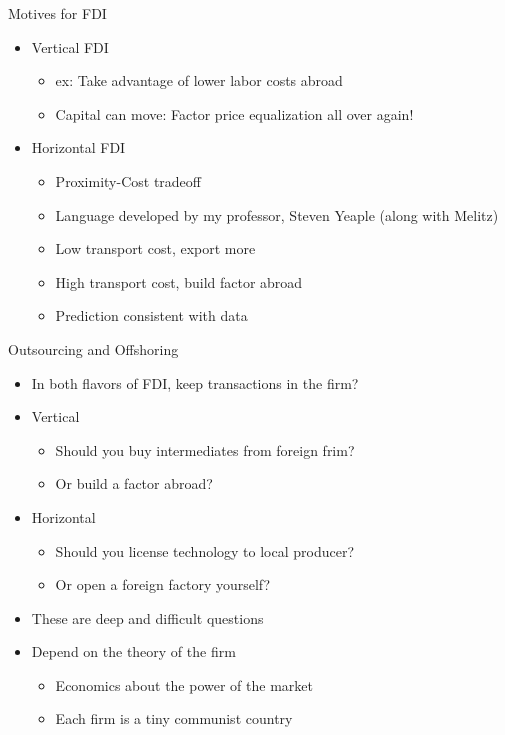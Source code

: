 \documentclass{beamer}
\begin{document}
\begin{frame}{Motives for FDI}
    \begin{itemize}
        \item Vertical FDI
        \begin{itemize}
            \item ex: Take advantage of lower labor costs abroad
            \item Capital can move: Factor price equalization all over again!
        \end{itemize}
        \item Horizontal FDI
        \begin{itemize}
            \item Proximity-Cost tradeoff
            \item Language developed by my professor, Steven Yeaple (along with Melitz)
            \item Low transport cost, export more
            \item High transport cost, build factor abroad
            \item Prediction consistent with data
        \end{itemize}
    \end{itemize}
\end{frame}

\begin{frame}{Outsourcing and Offshoring}
    \begin{itemize}
        \item In both flavors of FDI, keep transactions in the firm?
        \item Vertical
        \begin{itemize}
            \item Should you buy intermediates from foreign frim?
            \item Or build a factor abroad?
        \end{itemize}
        \item Horizontal
        \begin{itemize}
            \item Should you license technology to local producer?
            \item Or open a foreign factory yourself?
        \end{itemize}
        \item These are deep and difficult questions
        \item Depend on the theory of the firm
        \begin{itemize}
            \item Economics about the power of the market
            \item Each firm is a tiny communist country 
        \end{itemize}
    \end{itemize}
\end{frame}
\end{document}
